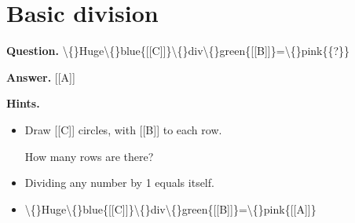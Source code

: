 \documentclass{article}
\begin{document}
\section*{Basic division}
\textbf{Question.} \textbackslash\{\}Huge\textbackslash\{\}blue\{[[C]]\}\textbackslash\{\}div\textbackslash\{\}green\{[[B]]\}=\textbackslash\{\}pink\{\{?\}\}

\textbf{Answer.} [[A]]

\textbf{Hints.}
\begin{itemize}
  \item Draw [[C]] circles, with [[B]] to each row.
                    
                
                
                    
                    How many rows are there?
  \item Dividing any number by 1 equals itself.
  \item \textbackslash\{\}Huge\textbackslash\{\}blue\{[[C]]\}\textbackslash\{\}div\textbackslash\{\}green\{[[B]]\}=\textbackslash\{\}pink\{[[A]]\}
\end{itemize}
\end{document}
